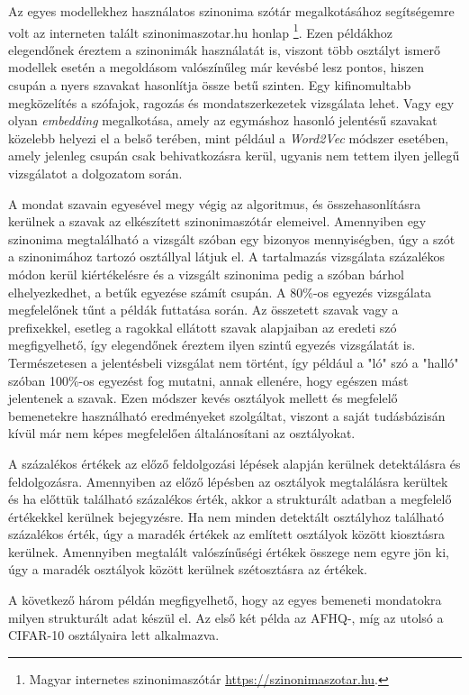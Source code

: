 Az egyes modellekhez használatos szinonima szótár megalkotásához segítségemre volt az interneten talált szinonimaszotar.hu honlap \footnote{Magyar internetes szinonimaszótár \url{https://szinonimaszotar.hu}.}. Ezen példákhoz elegendőnek éreztem a szinonimák használatát is, viszont több osztályt ismerő modellek esetén a megoldásom valószínűleg már kevésbé lesz pontos, hiszen csupán a nyers szavakat hasonlítja össze betű szinten. Egy kifinomultabb megközelítés a szófajok, ragozás és mondatszerkezetek vizsgálata lehet. Vagy egy olyan \textit{embedding} megalkotása, amely az egymáshoz hasonló jelentésű szavakat közelebb helyezi el a belső terében, mint például a \textit{Word2Vec} \cite{mikolov2013efficient} módszer esetében, amely jelenleg csupán csak behivatkozásra kerül, ugyanis nem tettem ilyen jellegű vizsgálatot a dolgozatom során.

A mondat szavain egyesével megy végig az algoritmus, és összehasonlításra kerülnek a szavak az elkészített szinonimaszótár elemeivel. Amennyiben egy szinonima megtalálható a vizsgált szóban egy bizonyos mennyiségben, úgy a szót a szinonimához tartozó osztállyal látjuk el. A tartalmazás vizsgálata százalékos módon kerül kiértékelésre és a vizsgált szinonima pedig a szóban bárhol elhelyezkedhet, a betűk egyezése számít csupán. A 80\%-os egyezés vizsgálata megfelelőnek tűnt a példák futtatása során. Az összetett szavak vagy a prefixekkel, esetleg a ragokkal ellátott szavak alapjaiban az eredeti szó megfigyelhető, így elegendőnek éreztem ilyen szintű egyezés vizsgálatát is. Természetesen a jelentésbeli vizsgálat nem történt, így például a "ló" szó a "halló" szóban 100\%-os egyezést fog mutatni, annak ellenére, hogy egészen mást jelentenek a szavak.
Ezen módszer kevés osztályok mellett és megfelelő bemenetekre használható eredményeket szolgáltat, viszont a saját tudásbázisán kívül már nem képes megfelelően általánosítani az osztályokat.

A százalékos értékek az előző feldolgozási lépések alapján kerülnek detektálásra és feldolgozásra. Amennyiben az előző lépésben az osztályok megtalálásra kerültek és ha előttük található százalékos érték, akkor a strukturált adatban a megfelelő értékekkel kerülnek bejegyzésre. Ha nem minden detektált osztályhoz található százalékos érték, úgy a maradék értékek az említett osztályok között kiosztásra kerülnek.
Amennyiben megtalált valószínűségi értékek összege nem egyre jön ki, úgy a maradék osztályok között kerülnek szétosztásra az értékek.

A következő három példán megfigyelhető, hogy az egyes bemeneti mondatokra milyen strukturált adat készül el. Az első két példa az AFHQ-, míg az utolsó a CIFAR-10 osztályaira lett alkalmazva.

